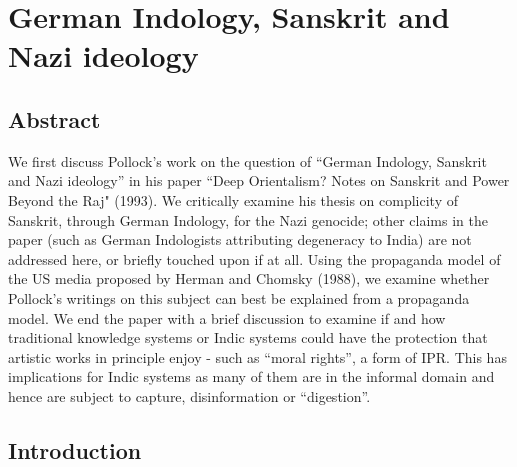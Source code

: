 \chapter{German Indology, Sanskrit and Nazi ideology}\label{chapter1}
\vskip -10pt

\vskip -10pt

\section*{Abstract}

We first discuss Pollock’s work on the question of “German Indology, Sanskrit and Nazi ideology” in his paper ``Deep Orientalism? Notes on Sanskrit and Power Beyond the Raj" (1993). We critically examine his thesis on complicity of Sanskrit, through German Indology, for the Nazi genocide; other claims in the paper (such as German Indologists attributing degeneracy to India) are not addressed here, or briefly touched upon if at all. Using the propaganda model of the US media proposed by Herman and Chomsky (1988), we examine whether Pollock’s writings on this subject can best be explained from a propaganda model.  We end the paper with a brief discussion to examine if and how traditional knowledge systems or Indic systems could have the protection that artistic works in principle enjoy - such as ``moral rights”, a form of IPR\@. This has implications for Indic systems as many of them are in the informal domain and hence are subject to capture, disinformation or “digestion”.

\vskip -10pt


\section*{Introduction}

